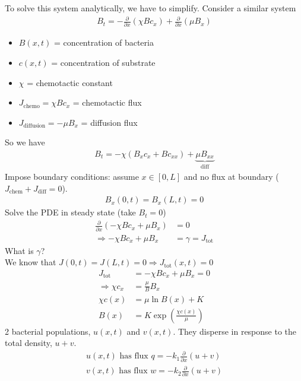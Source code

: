 \documentclass[12pt, letterpaper]{article}
\begin{document}
To solve this system analytically, we have to simplify. Consider a similar system
\begin{align*}
    B_t = - \frac{\partial}{\partial x}(\chi B c_x) + \frac{\partial}{\partial x} (\mu B_x)
\end{align*}
\begin{itemize}
    \item $B(x,t)$ = concentration of bacteria 
    \item $c(x,t)$ = concentration of substrate
    \item $\chi$ = chemotactic constant
    \item $J_{\text{chemo}} = \chi B c_x$ = chemotactic flux
    \item $J_{\text{diffusion}} = - \mu B_x$ = diffusion flux
\end{itemize}
So we have 
\begin{align*}
    B_t = -\chi (B_x c_x + B c_{xx}) + \underbrace{\mu B_{xx}}_{\text{diff}}
\end{align*}
Impose boundary conditions: assume $x \in [0,L]$ and no flux at boundary ($J_{\text{chem}}+J_{\text{diff}} = 0$).
\begin{align*}
    B_x(0,t) = B_x(L,t) = 0 
\end{align*}
Solve the PDE in steady state (take $B_t = 0$)
\begin{align*}
    \frac{\partial}{\partial x} \left(-\chi B c_x + \mu B_x\right) &= 0 \tag{conservation law} \\
    \Rightarrow - \chi B c_x + \mu B_x &= \gamma = J_{\text{tot}}
\end{align*}
What is $\gamma$? \\
We know that $J(0,t) = J(L,t) = 0 \Rightarrow J_{\text{tot}}(x,t) = 0$
\begin{align*}
    J_{\text{tot}} &= - \chi B c_x + \mu B_x = 0 \\
    \Rightarrow \chi c_x &= \frac \mu B B_x  \\
    \chi c(x) &= \mu \ln B(x) + K \\
    B(x) &= K\exp\left(\frac{\chi c(x)}{\mu}\right)
\end{align*}
 2 bacterial populations, $u(x,t)$ and $v(x,t)$. They disperse in response to 
the total density, $u+v$. 
\begin{align*}
    u(x,t) \text{ has flux } q = -k_1 \frac{\partial}{\partial x}(u+v) \\
    v(x,t) \text{ has flux } w = -k_2 \frac{\partial}{\partial x}(u+v) \\
\end{align*}
\end{document}
